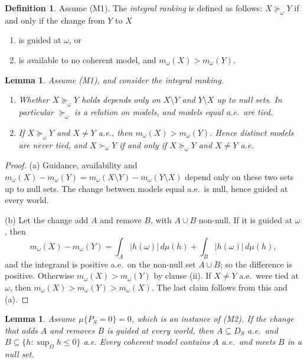 \documentclass[11pt]{article}
\theoremstyle{plain}
\newtheorem{lemma}[theorem]{Lemma}
\theoremstyle{definition}
\newtheorem{definition}[theorem]{Definition}
\theoremstyle{remark}
\begin{document}
\begin{definition}\label{def:integral}
Assume (M1). The \emph{integral ranking} is defined as follows: $X\succeq_\omega Y$ if and only
if the change from $Y$ to $X$
\begin{enumerate}[label=(\roman*)]
  \item is guided at $\omega$, or
  \item is available to no coherent model, and $m_\omega(X)>m_\omega(Y)$.
\end{enumerate}
\end{definition}

\begin{lemma}\label{lem:structure}
Assume (M1), and consider the integral ranking.
\begin{enumerate}[label=(\alph*)]
  \item Whether $X\succeq_\omega Y$ holds depends only on $X\setminus Y$ and $Y\setminus X$ up
  to null sets. In particular $\succeq_\omega$ is a relation on models, and models equal a.e.\
  are tied.
  \item If $X\succeq_\omega Y$ and $X\ne Y$ a.e., then $m_\omega(X)>m_\omega(Y)$. Hence
  distinct models are never tied, and $X\succ_\omega Y$ if and only if $X\succeq_\omega Y$ and
  $X\ne Y$ a.e.
\end{enumerate}
\end{lemma}

\begin{proof}
(a) Guidance, availability and $m_\omega(X)-m_\omega(Y)=m_\omega(X\setminus Y)-m_\omega(Y
\setminus X)$ depend only on these two sets up to null sets. The change between models equal
a.e.\ is null, hence guided at every world.

(b) Let the change add $A$ and remove $B$, with $A\cup B$ non-null. If it is guided at
$\omega$, then
\[
  m_\omega(X)-m_\omega(Y)=\int_A|h(\omega)|\,d\mu(h)+\int_B|h(\omega)|\,d\mu(h),
\]
and the integrand is positive a.e.\ on the non-null set $A\cup B$; so the difference is
positive. Otherwise $m_\omega(X)>m_\omega(Y)$ by clause (ii). If $X\ne Y$ a.e.\ were tied at
$\omega$, then $m_\omega(X)>m_\omega(Y)>m_\omega(X)$. The last claim follows from this and (a).
\end{proof}

\begin{lemma}\label{lem:guidedeverywhere}
Assume $\mu\{P_S=0\}=0$, which is an instance of (M2). If the change that adds $A$ and removes
$B$ is guided at every world, then $A\subseteq D_S$ a.e.\ and $B\subseteq\{h:\sup_\Omega h\le
0\}$ a.e. Every coherent model contains $A$ a.e.\ and meets $B$ in a null set.
\end{lemma}
\end{document}
